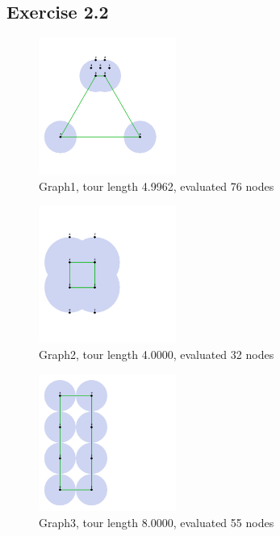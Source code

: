 \documentclass[11pt,a4paper]{article}
\begin{document}
\subsection{Exercise 2.2}
\begin{figure}[h!]
    \centering
    \includegraphics[width=0.4\textwidth, trim=0px 0px 200px 0px]{graph1.png}
    \caption{Graph1, tour length 4.9962, evaluated 76 nodes}
\end{figure}
\begin{figure}[h!]
    \centering
    \includegraphics[width=0.4\textwidth, trim=0px 0px 200px 0px]{graph2.png}
    \caption{Graph2, tour length 4.0000, evaluated 32 nodes}
\end{figure}
\begin{figure}[h!]
    \centering
    \includegraphics[width=0.4\textwidth, trim=0px 0px 300px 0px]{graph3.png}
    \caption{Graph3, tour length 8.0000, evaluated 55 nodes}
\end{figure}




\end{document}
